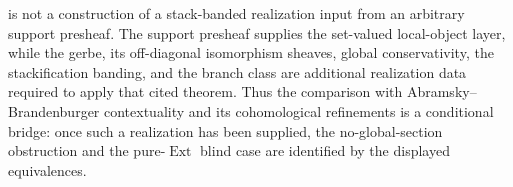 \begin{remark}\label{rem:contextuality-comparison-conditional}
 is not a construction of a
stack-banded realization input from an arbitrary support presheaf. The support
presheaf supplies the set-valued local-object layer, while the gerbe, its
off-diagonal isomorphism sheaves, global conservativity, the stackification
banding, and the branch class are additional realization data required to apply
that cited theorem. Thus
the comparison with
Abramsky--Brandenburger contextuality and its cohomological refinements
\cite{AbramskyBrandenburger2011,AbramskyMansfieldBarbosa2012,AbramskyBarbosaKishidaLalMansfield2015}
is a conditional bridge: once such a realization has been supplied, the
no-global-section obstruction and the pure-$\operatorname{Ext}$ blind case are
identified by the displayed equivalences.
\end{remark}
